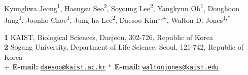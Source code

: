 Kyunghwa Jeong\textsuperscript{1},
Haengsu Seo\textsuperscript{2},
Soyoung Lee\textsuperscript{2},
Yangkyun Oh\textsuperscript{1},
Donghoon Jang\textsuperscript{1},
Joonho Choe\textsuperscript{1},
Jung-ha Lee\textsuperscript{2},
Daesoo Kim\textsuperscript{1,$+$},
Walton D. Jones\textsuperscript{1,$\ast$}

{\bf 1} KAIST, Biological Sciences, Daejeon, 302-726, Republic of Korea
\\
{\bf 2} Sogang University, Department of Life Science, Seoul, 121-742, Republic of Korea
\\
{\bf $+$ E-mail:} \href{mailto:daesoo@kaist.ac.kr}{\nolinkurl{daesoo@kaist.ac.kr}}
{\bf $\ast$ E-mail:} \href{mailto:waltonjones@kaist.edu}{\nolinkurl{waltonjones@kaist.edu}}
    
